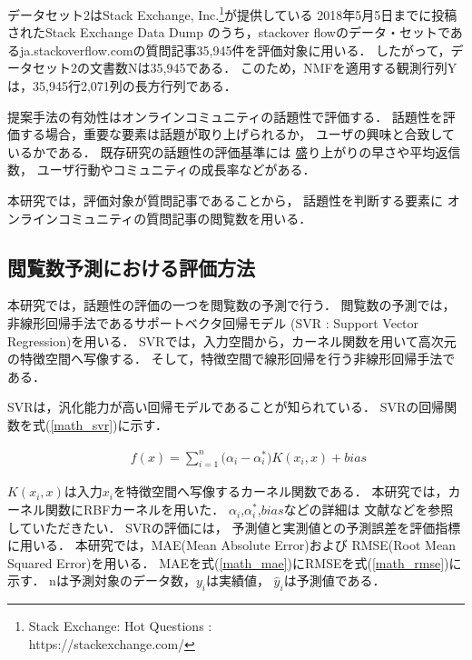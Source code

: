 \documentclass[12pt,a4paper,twocolumn,twoside]{jsik}
\begin{document}
データセット2はStack Exchange, Inc.\footnote{Stack Exchange: Hot Questions : \\https://stackexchange.com/}が提供している
2018年5月5日までに投稿されたStack Exchange Data Dump
\cite{StackExchange}
のうち，stackover flowのデータ・セットであるja.stackoverflow.comの質問記事35,945件を評価対象に用いる．
%
したがって，データセット2の文書数Nは35,945である．
このため，NMFを適用する観測行列Yは，35,945行2,071列の長方行列である．

\newpage
提案手法の有効性はオンラインコミュニティの話題性で評価する．
%
話題性を評価する場合，重要な要素は話題が取り上げられるか，
ユーザの興味と合致しているかである．
%
既存研究の話題性の評価基準には
盛り上がりの早さや平均返信数\cite{article_matsumura}，
ユーザ行動やコミュニティの成長率\cite{article_toriumi}などがある．

本研究では，評価対象が質問記事であることから，
話題性を判断する要素に
オンラインコミュニティの質問記事の閲覧数を用いる．

\subsection{閲覧数予測における評価方法}\label{result_1}
本研究では，話題性の評価の一つを閲覧数の予測で行う．
閲覧数の予測では，非線形回帰手法であるサポートベクタ回帰モデル
(SVR : Support Vector Regression)\cite{svr}を用いる．
%
SVRでは，入力空間から，カーネル関数を用いて高次元の特徴空間へ写像する．
そして，特徴空間で線形回帰を行う非線形回帰手法である．

SVRは，汎化能力が高い回帰モデルであることが知られている\cite{svr_general}．
%
SVRの回帰関数を式(\ref{math_svr})に示す．

\begin{eqnarray}
\label{math_svr}
\qquad f(x) = \sum_{i=1}^{n} \big(\alpha_{i} - \alpha_{i}^\ast \big)K(x_{i},x)  + bias
\end{eqnarray}

$K(x_{i},x)$は入力$x_{i}$を特徴空間へ写像するカーネル関数である．
本研究では，カーネル関数にRBFカーネルを用いた．
$\alpha_{i}$,$\alpha_{i}^\ast$,$bias$などの詳細は
文献\cite{rbf}などを参照していただきたい．
%
SVRの評価には，
予測値と実測値との予測誤差を評価指標に用いる．
本研究では，MAE(Mean Absolute Error)および
RMSE(Root Mean Squared Error)を用いる．
%
MAEを式(\ref{math_mae})にRMSEを式(\ref{math_rmse})に示す．
%
nは予測対象のデータ数，$y_{i}$は実績値，
$\widehat{y}_i$は予測値である．
\end{document}
